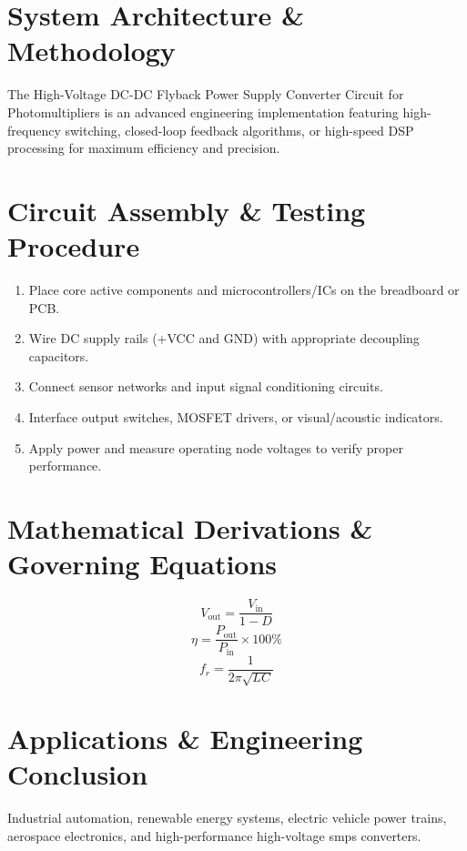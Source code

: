 \documentclass[11pt,a4paper]{article}
\begin{document}
\section{System Architecture \& Methodology}
The High-Voltage DC-DC Flyback Power Supply Converter Circuit for Photomultipliers is an advanced engineering implementation featuring high-frequency switching, closed-loop feedback algorithms, or high-speed DSP processing for maximum efficiency and precision.

\section{Circuit Assembly \& Testing Procedure}
\begin{enumerate}
    \item Place core active components and microcontrollers/ICs on the breadboard or PCB.
    \item Wire DC supply rails (+VCC and GND) with appropriate decoupling capacitors.
    \item Connect sensor networks and input signal conditioning circuits.
    \item Interface output switches, MOSFET drivers, or visual/acoustic indicators.
    \item Apply power and measure operating node voltages to verify proper performance.
\end{enumerate}

\section{Mathematical Derivations \& Governing Equations}
\begin{equation}
V_{\text{out}} = \frac{V_{\text{in}}}{1 - D}
\end{equation}
\begin{equation}
\eta = \frac{P_{\text{out}}}{P_{\text{in}}} \times 100\%
\end{equation}
\begin{equation}
f_r = \frac{1}{2\pi \sqrt{L C}}
\end{equation}

\section{Applications \& Engineering Conclusion}
Industrial automation, renewable energy systems, electric vehicle power trains, aerospace electronics, and high-performance high-voltage smps converters.
\end{document}
